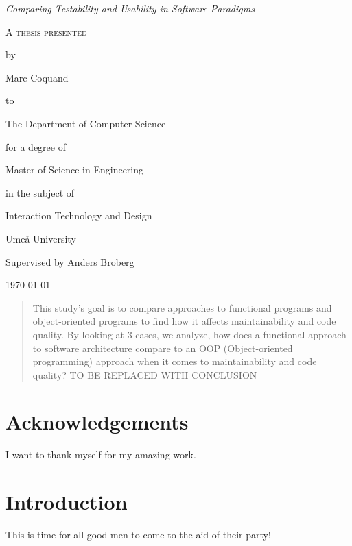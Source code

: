 \documentclass[12pt]{article}
\theoremstyle{definition}
\theoremstyle{theorem}
\begin{document}
\begin{titlepage}
	\centering
    \null
    \vfill
    {\Large\itshape Comparing Testability and Usability in Software Paradigms
    \par}
    \vspace{1.5cm}
	{\scshape 
    A thesis presented \par 
    by\par
	Marc Coquand\par
	to\par
    The Department of Computer Science\par
    \vspace{1.5cm}
	for a degree of\par
    Master of Science in Engineering\par
    in the subject of\par
    Interaction Technology and Design\par}
    \vfill
    Umeå University\par
    Supervised by Anders Broberg\par
	\today\par
\end{titlepage}
\clearpage
\thispagestyle{empty}

\clearpage\newpage
\thispagestyle{empty}

\begin{abstract} 

    This study's goal is to compare approaches to functional programs and
    object-oriented programs to find how it affects maintainability and code
    quality. By looking at 3 cases, we analyze, how does a functional approach
    to software architecture compare to an OOP (Object-oriented programming)
    approach when it comes to maintainability and code quality? TO BE REPLACED
    WITH CONCLUSION

\end{abstract}

\clearpage\newpage
\thispagestyle{empty}

\section*{Acknowledgements}

I want to thank myself for my amazing work.

\clearpage\newpage
\thispagestyle{empty}

\tableofcontents
\newpage

\section{Introduction}
This is time for all good men to come to the aid of their party!
\end{document}
